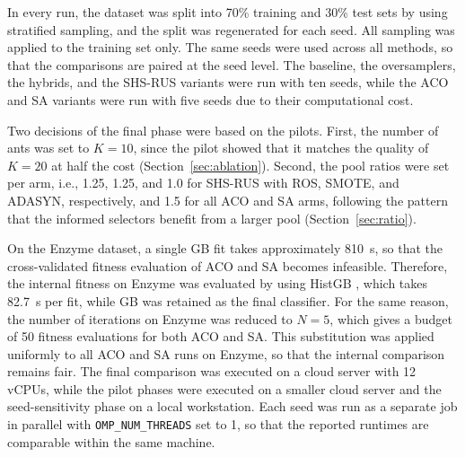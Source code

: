 \documentclass[10pt,a4paper]{article}
\begin{document}
\begin{table}[htbp]
\centering
\caption{The staged experimental design.}
\label{tab:phases}
\end{table}

In every run, the dataset was split into 70\% training and 30\% test
sets by using stratified sampling, and the split was regenerated for
each seed. All sampling was applied to the training set only. The same
seeds were used across all methods, so that the comparisons are paired
at the seed level. The baseline, the oversamplers, the hybrids, and the
SHS-RUS variants were run with ten seeds, while the ACO and SA variants
were run with five seeds due to their computational cost.

Two decisions of the final phase were based on the pilots. First, the
number of ants was set to $K = 10$, since the pilot showed that it
matches the quality of $K = 20$ at half the cost
(Section~\ref{sec:ablation}). Second, the pool ratios were set per arm,
i.e., 1.25, 1.25, and 1.0 for SHS-RUS with ROS, SMOTE, and ADASYN,
respectively, and 1.5 for all ACO and SA arms, following the pattern
that the informed selectors benefit from a larger pool
(Section~\ref{sec:ratio}).

On the Enzyme dataset, a single GB fit takes approximately 810~s, so
that the cross-validated fitness evaluation of ACO and SA becomes
infeasible. Therefore, the internal fitness on Enzyme was evaluated by
using HistGB \citep{ke2017lightgbm}, which takes 82.7~s per fit, while GB was retained as the final classifier. For the same reason, the number of iterations on Enzyme was reduced to $N = 5$, which gives a budget of 50 fitness evaluations for both ACO and SA. This substitution was applied
uniformly to all ACO and SA runs on Enzyme, so that the internal
comparison remains fair. The final comparison was executed on a cloud server with 12 vCPUs, while the pilot phases were executed on a smaller cloud server and the seed-sensitivity phase on a local workstation. Each seed was run as a separate job in parallel with
\texttt{OMP\_NUM\_THREADS} set to 1, so that the reported runtimes are
comparable within the same machine.
\end{document}
